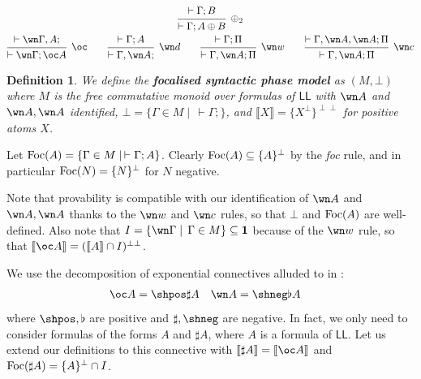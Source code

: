 \documentclass[11pt]{article}
\newtheorem{definition}{Definition}[section]
\newcommand\LL{\textsf{LL}}
\newcommand\0{\textbf{0}}
\newcommand\1{\textbf{1}}
\newcommand\sem[1]{{\llbracket #1 \rrbracket}}
\newcommand\biperp{{\perp\perp}}
\newcommand\Foc[1]{\textup{Foc}(#1)}
\begin{document}
\begin{gather*}
    \begin{prooftree}
        \hypo{\vdash \Gamma; B}
        \infer1[$\oplus_2$]{\vdash \Gamma; A \oplus B}
    \end{prooftree}
    \\
    \begin{prooftree}
        \hypo{\vdash \wn\Gamma, A;}
        \infer1[$\oc$]{\vdash \wn\Gamma; \oc A}
    \end{prooftree}
    \qquad
    \begin{prooftree}
        \hypo{\vdash \Gamma; A}
        \infer1[$\wn d$]{\vdash \Gamma, \wn A;}
    \end{prooftree}
    \qquad
    \begin{prooftree}
        \hypo{\vdash \Gamma; \Pi}
        \infer1[$\wn w$]{\vdash \Gamma, \wn A; \Pi}
    \end{prooftree}
    \qquad
    \begin{prooftree}
        \hypo{\vdash \Gamma, \wn A, \wn A; \Pi}
        \infer1[$\wn c$]{\vdash \Gamma, \wn A; \Pi}
    \end{prooftree}
\end{gather*}

\begin{definition}
We define the \textbf{focalised syntactic phase model} as $(M, \bot)$ where $M$ is the
free commutative monoid over formulas of $\LL$ with $\wn A$ and $\wn A, \wn A$ identified,
$\bot = \{\Gamma \in M \mid\,\vdash \Gamma;\}$, and $\sem{X} = \{X^\perp\}^\biperp$ for positive atoms $X$.
\end{definition}

Let $\Foc{A} = {\{\Gamma \in M \mid\, \vdash \Gamma; A\}}$.
Clearly $\Foc{A} \subseteq \{A\}^\perp$ by the \textit{foc} rule, and in particular
$\Foc{N} = \{N\}^\perp$ for $N$ negative.

Note that provability is compatible with our identification of $\wn A$ and $\wn A, \wn A$ thanks to the $\wn w$ and $\wn c$ rules,
so that $\bot$ and $\Foc{A}$ are well-defined. Also note that $I = \{\wn \Gamma\mid\,\Gamma\in M\} \subseteq \1$ because of the
$\wn w$ rule, so that $\sem{\oc A} = (\sem{A} \cap I)^\biperp$.

We use the decomposition of exponential connectives alluded to in \cite[section 4.1]{laurent}: \begin{align*}
    \oc A &= \shpos\sharp A & \wn A &= \shneg\flat A
\end{align*}
where $\shpos, \flat$ are positive and $\sharp, \shneg$ are negative.
In fact, we only need to consider formulas of the forms $A$ and $\sharp A$, where $A$ is a formula of $\LL$.
Let us extend our definitions to this connective
with $\sem{\sharp A} = \sem{\oc A}$ and $\Foc{\sharp A} = \{A\}^\perp \cap I$.
\end{document}
